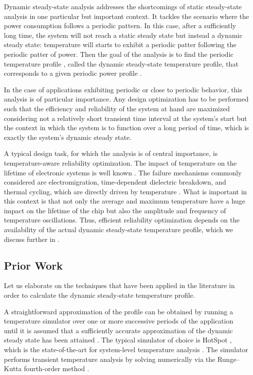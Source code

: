 Dynamic steady-state analysis addresses the shortcomings of static steady-state
analysis in one particular but important context. It tackles the scenario where
the power consumption follows a periodic pattern. In this case, after a
sufficiently long time, the system will not reach a static steady state but
instead a dynamic steady state: temperature will starts to exhibit a periodic
patter following the periodic patter of power. Then the goal of the analysis is
to find the periodic temperature profile \mq, called the dynamic steady-state
temperature profile, that corresponds to a given periodic power profile \mp.

In the case of applications exhibiting periodic or close to periodic behavior,
this analysis is of particular importance. Any design optimization has to be
performed such that the efficiency and reliability of the system at hand are
maximized considering not a relatively short transient time interval at the
system's start but the context in which the system is to function over a long
period of time, which is exactly the system's dynamic steady state.

A typical design task, for which the analysis is of central importance, is
temperature-aware reliability optimization. The impact of temperature on the
lifetime of electronic systems is well known \cite{srinivasan2004, coskun2006,
jedec2010, xiang2010}. The failure mechanisms commonly considered are
electromigration, time-dependent dielectric breakdown, and thermal cycling,
which are directly driven by temperature \cite{jedec2010}. What is important in
this context is that not only the average and maximum temperature have a huge
impact on the lifetime of the chip but also the amplitude and frequency of
temperature oscillations. Thus, efficient reliability optimization depends on
the availability of the actual dynamic steady-state temperature profile, which
we discuss further in .

\subsection{Prior Work}

Let us elaborate on the techniques that have been applied in the literature in
order to calculate the dynamic steady-state temperature profile.

A straightforward approximation of the profile can be obtained by running a
temperature simulator over one or more successive periods of the application
until it is assumed that a sufficiently accurate approximation of the dynamic
steady state has been attained \cite{srinivasan2004}. The typical simulator of
choice is HotSpot \cite{skadron2003}, which is the state-of-the-art for
system-level temperature analysis \cite{srinivasan2004, liao2005, coskun2006,
liu2007, huang2009b, xiang2010, thiele2011}. The simulator performs transient
temperature analysis by solving  numerically
via the Runge--Kutta fourth-order method \cite{press2007}.

